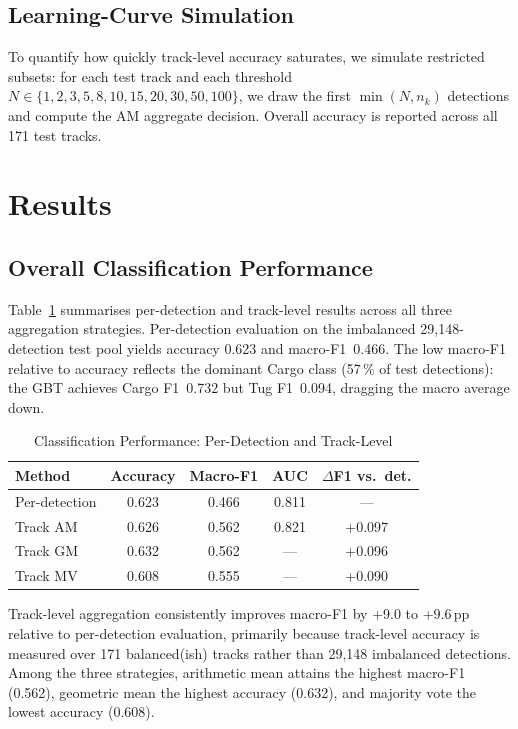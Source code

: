 \documentclass[10pt,journal,compsoc]{IEEEtran}
\begin{document}
\subsection{Learning-Curve Simulation}

To quantify how quickly track-level accuracy saturates, we simulate restricted
subsets: for each test track and each threshold $N \in \{1,2,3,5,8,10,15,20,30,50,100\}$,
we draw the first $\min(N, n_k)$ detections and compute the AM aggregate
decision.  Overall accuracy is reported across all 171 test tracks.

\section{Results}\label{sec:results}

\subsection{Overall Classification Performance}

Table~\ref{tab:main} summarises per-detection and track-level results across
all three aggregation strategies.  Per-detection evaluation on the
imbalanced 29,148-detection test pool yields accuracy 0.623 and
macro-F1~0.466.  The low macro-F1 relative to accuracy reflects the dominant
Cargo class (57\,\% of test detections): the GBT achieves Cargo F1~0.732 but
Tug F1~0.094, dragging the macro average down.

\begin{table}[!t]
\centering\small
\caption{Classification Performance: Per-Detection and Track-Level}
\label{tab:main}
\begin{tabular}{lcccc}
\toprule
Method & Accuracy & Macro-F1 & AUC & $\Delta$F1 vs.\ det. \\
\midrule
Per-detection    & 0.623 & 0.466 & 0.811 & --- \\
Track AM         & 0.626 & 0.562 & 0.821 & +0.097 \\
Track GM         & 0.632 & 0.562 & --- & +0.096 \\
Track MV         & 0.608 & 0.555 & --- & +0.090 \\
\bottomrule
\end{tabular}
\end{table}

Track-level aggregation consistently improves macro-F1 by +9.0 to +9.6\,pp
relative to per-detection evaluation, primarily because track-level accuracy
is measured over 171 balanced(ish) tracks rather than 29,148 imbalanced
detections.  Among the three strategies, arithmetic mean attains the highest
macro-F1 (0.562), geometric mean the highest accuracy (0.632), and majority vote the lowest accuracy (0.608).
\end{document}
